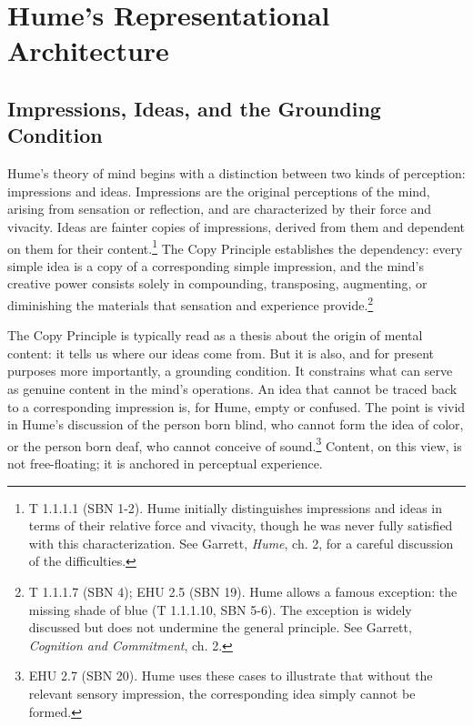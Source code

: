 \documentclass[11pt]{article}
\begin{document}
\section{Hume's Representational Architecture}

\subsection{Impressions, Ideas, and the Grounding Condition}

Hume's theory of mind begins with a distinction between two kinds of perception: impressions and ideas. Impressions are the original perceptions of the mind, arising from sensation or reflection, and are characterized by their force and vivacity. Ideas are fainter copies of impressions, derived from them and dependent on them for their content.\footnote{T 1.1.1.1 (SBN 1-2). Hume initially distinguishes impressions and ideas in terms of their relative force and vivacity, though he was never fully satisfied with this characterization. See Garrett, \emph{Hume}, ch. 2, for a careful discussion of the difficulties.} The Copy Principle establishes the dependency: every simple idea is a copy of a corresponding simple impression, and the mind's creative power consists solely in compounding, transposing, augmenting, or diminishing the materials that sensation and experience provide.\footnote{T 1.1.1.7 (SBN 4); EHU 2.5 (SBN 19). Hume allows a famous exception: the missing shade of blue (T 1.1.1.10, SBN 5-6). The exception is widely discussed but does not undermine the general principle. See Garrett, \emph{Cognition and Commitment}, ch. 2.}

The Copy Principle is typically read as a thesis about the origin of mental content: it tells us where our ideas come from. But it is also, and for present purposes more importantly, a grounding condition. It constrains what can serve as genuine content in the mind's operations. An idea that cannot be traced back to a corresponding impression is, for Hume, empty or confused. The point is vivid in Hume's discussion of the person born blind, who cannot form the idea of color, or the person born deaf, who cannot conceive of sound.\footnote{EHU 2.7 (SBN 20). Hume uses these cases to illustrate that without the relevant sensory impression, the corresponding idea simply cannot be formed.} Content, on this view, is not free-floating; it is anchored in perceptual experience.
\end{document}
